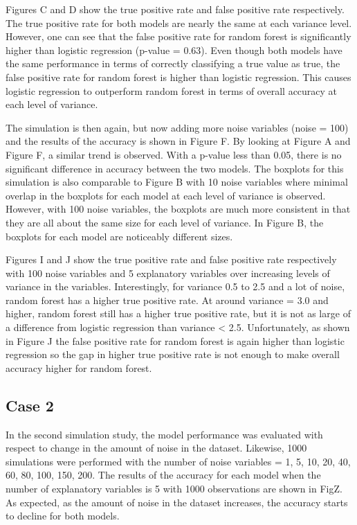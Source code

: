 \documentclass{llncs}
\begin{document}
Figures C and D show the true positive rate and false positive rate respectively. The true positive rate for both models are nearly the same at each variance level.  However, one can see that the false positive rate for random forest is significantly higher than logistic regression (p-value = 0.63).  Even though both models have the same performance in terms of correctly classifying a true value as true, the false positive rate for random forest is higher than logistic regression.  This causes logistic regression to outperform random forest in terms of overall accuracy at each level of variance.

The simulation is then again, but now adding more noise variables (noise = 100) and the results of the accuracy is shown in Figure F. By looking at Figure A and Figure F, a similar trend is observed. With a p-value less than 0.05, there is no significant difference in accuracy between the two models. The boxplots for this simulation is also comparable to Figure B with 10 noise variables where minimal overlap in the boxplots for each model at each level of variance is observed. However, with 100 noise variables, the boxplots are much more consistent in that they are all about the same size for each level of variance.  In Figure B, the boxplots for each model are noticeably different sizes.

Figures I and J show the true positive rate and false positive rate respectively with 100 noise variables and 5 explanatory variables over increasing levels of variance in the variables. Interestingly, for variance 0.5 to 2.5 and a lot of noise, random forest has a higher true positive rate.  At around variance = 3.0 and higher, random forest still has a higher true positive rate, but it is not as large of a difference from logistic regression than variance < 2.5.  Unfortunately, as shown in Figure J the false positive rate for random forest is again higher than logistic regression so the gap in higher true positive rate is not enough to make overall accuracy higher for random forest.


\subsection{Case 2}

In the second simulation study, the model performance was evaluated with respect to change in the amount of noise in the dataset. Likewise, 1000 simulations were performed with the number of noise variables = 1, 5, 10, 20, 40, 60, 80, 100, 150, 200.  The results of the accuracy for each model when the number of explanatory variables is 5 with 1000 observations are shown in FigZ.  As expected, as the amount of noise in the dataset increases, the accuracy starts to decline for both models.
\end{document}

